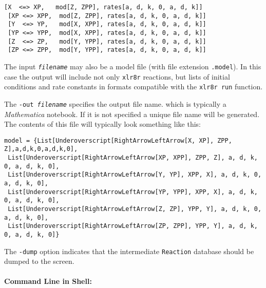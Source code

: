 \begin{Verbatim}[frame=single]
 [X  <=> XP,   mod[Z, ZPP], rates[a, d, k, 0, a, d, k]]
 [XP <=> XPP,  mod[Z, ZPP], rates[a, d, k, 0, a, d, k]]
 [Y  <=> YP,   mod[X, XPP], rates[a, d, k, 0, a, d, k]] 
 [YP <=> YPP,  mod[X, XPP], rates[a, d, k, 0, a, d, k]] 
 [Z  <=> ZP,   mod[Y, YPP], rates[a, d, k, 0, a, d, k]]
 [ZP <=> ZPP,  mod[Y, YPP], rates[a, d, k, 0, a, d, k]]
\end{Verbatim}

The input {\tt \textit{filename}} may also be a model file (with file extension {\tt .model}). In this case the output will include not only {\tt xlr8r} reactions, but lists of initial conditions and rate constants in formats compatible with the {\tt xlr8r run} function. 

The {\tt -out \textit{filename}} specifies the output file name. which is typically a \textit{Mathematica} notebook. If it is not specified a unique file name will be generated. The contents of this file will typically look something like this: 
\begin{footnotesize}
\begin{Verbatim}[frame=single]
model = {List[Underoverscript[RightArrowLeftArrow[X, XP], ZPP, Z],a,d,k,0,a,d,k,0],
 List[Underoverscript[RightArrowLeftArrow[XP, XPP], ZPP, Z], a, d, k, 0, a, d, k, 0],
 List[Underoverscript[RightArrowLeftArrow[Y, YP], XPP, X], a, d, k, 0, a, d, k, 0],
 List[Underoverscript[RightArrowLeftArrow[YP, YPP], XPP, X], a, d, k, 0, a, d, k, 0],
 List[Underoverscript[RightArrowLeftArrow[Z, ZP], YPP, Y], a, d, k, 0, a, d, k, 0],
 List[Underoverscript[RightArrowLeftArrow[ZP, ZPP], YPP, Y], a, d, k, 0, a, d, k, 0]}
\end{Verbatim}
\end{footnotesize}

The {\tt -dump} option indicates that the intermediate {\tt Reaction} database should be dumped to the screen. 

\newpage

\paragraph{Command Line in Shell:}\ 


